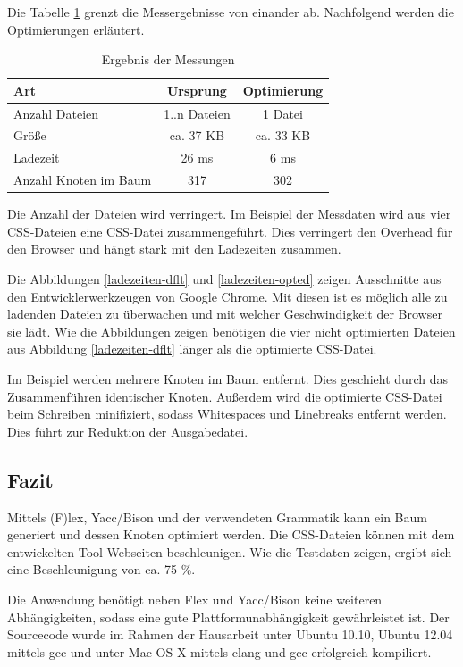 Die Tabelle \ref{messungen-ergebnis} grenzt die Messergebnisse von einander ab. Nachfolgend werden die Optimierungen erläutert.

\begin{table}[ht!]
	\centering
	\begin{tabular}{l | c | c}
		Art & Ursprung & Optimierung \\
		\hline
		Anzahl Dateien & 1..n Dateien & 1 Datei \\
		Größe & ca. 37 KB & ca. 33 KB \\
		Ladezeit & 26 ms & 6 ms\\
		Anzahl Knoten im Baum & 317 & 302 \\
	\end{tabular}
	\caption{Ergebnis der Messungen}
	\label{messungen-ergebnis}
\end{table}

Die Anzahl der Dateien wird verringert. Im Beispiel der Messdaten wird aus vier CSS-Dateien eine CSS-Datei zusammengeführt. Dies verringert den Overhead für den Browser und hängt stark mit den Ladezeiten zusammen. 

Die Abbildungen \ref{ladezeiten-dflt} und \ref{ladezeiten-opted} zeigen Ausschnitte aus den Entwicklerwerkzeugen von Google Chrome. Mit diesen ist es möglich alle zu ladenden Dateien zu überwachen und mit welcher Geschwindigkeit der Browser sie lädt. Wie die Abbildungen zeigen benötigen die vier nicht optimierten Dateien aus Abbildung \ref{ladezeiten-dflt} länger als die optimierte CSS-Datei. 

Im Beispiel werden mehrere Knoten im Baum entfernt. Dies geschieht durch das Zusammenführen identischer Knoten. Außerdem wird die optimierte CSS-Datei beim Schreiben minifiziert, sodass Whitespaces und Linebreaks entfernt werden. Dies führt zur Reduktion der Ausgabedatei. 
 
\pagebreak

\subsection{Fazit}
Mittels (F)lex, Yacc/Bison und der verwendeten Grammatik kann ein Baum generiert und dessen Knoten optimiert werden. Die CSS-Dateien können mit dem entwickelten Tool Webseiten beschleunigen. Wie die Testdaten zeigen, ergibt sich eine Beschleunigung von ca. 75 \%. 

Die Anwendung benötigt neben Flex und Yacc/Bison keine weiteren Abhängigkeiten, sodass eine gute Plattformunabhängigkeit gewährleistet ist. Der Sourcecode wurde im Rahmen der Hausarbeit unter Ubuntu 10.10, Ubuntu 12.04 mittels gcc und unter Mac OS X mittels clang und gcc erfolgreich kompiliert. 

